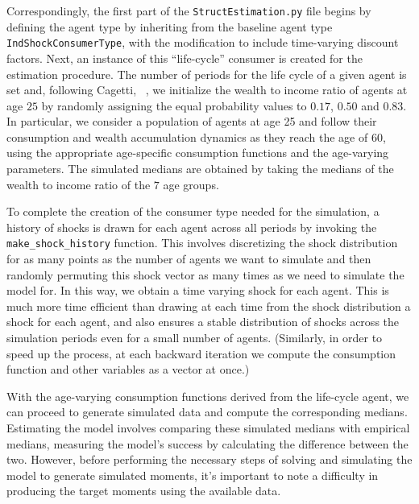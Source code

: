\documentclass[titlepage, headings=optiontotocandhead]{\econtex}
\begin{document}
Correspondingly, the first part of the \texttt{StructEstimation.py} file begins by defining
the agent type by inheriting from the baseline agent type \texttt{IndShockConsumerType},
with the modification to include time-varying discount factors. Next, an instance of
this ``life-cycle'' consumer is created for the estimation procedure.
The number of periods for the life cycle of a given agent is set and, following Cagetti,
~\citeyearpar{cagettiWprofiles}, we
initialize the wealth to income ratio of agents at age $25$ by
randomly assigning the equal probability values to $0.17$, $0.50$ and
$0.83$. In particular, we
consider a population of agents at age 25 and follow their consumption
and wealth accumulation dynamics as they reach the age of $60$, using
the appropriate age-specific consumption functions and the age-varying
parameters. The simulated medians are obtained by taking the medians
of the wealth to income ratio of the $7$ age groups.

To complete the creation of the consumer type needed for the simulation,
a history of shocks is drawn for each agent across all periods by invoking the
\texttt{make\_shock\_history} function. This involves
discretizing the shock distribution for as many points as the number
of agents we want to simulate and then randomly permuting this
shock vector as many times as we need to simulate the model for. In this way,
we obtain a time varying shock for each agent. This is much more time efficient than
drawing at each time from the shock distribution a shock for each
agent, and also ensures a stable distribution of shocks across the
simulation periods even for a small number of agents. (Similarly, in
order to speed up the process, at each backward iteration we compute
the consumption function and other variables as a vector at once.)

With the age-varying consumption functions derived from the life-cycle agent,
we can proceed to generate simulated data and compute the corresponding medians.
Estimating the model involves comparing these simulated medians with empirical medians,
measuring the model's success by calculating the difference between the two.
However, before performing the necessary steps of solving and simulating the model to
generate simulated moments, it's important to note a difficulty in producing the
target moments using the available data.
\end{document}
